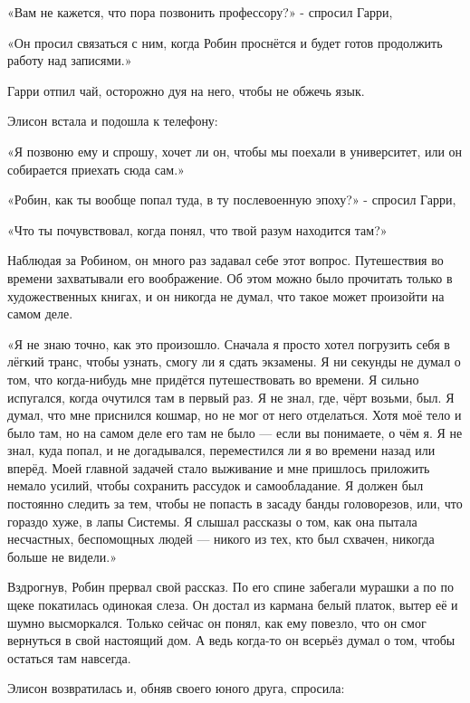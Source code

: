 \documentclass[a4paper,12pt]{book}
\begin{document}
\par
«Вам не кажется, что пора позвонить профессору?» - спросил Гарри,
\par
«Он просил связаться с ним, когда Робин проснётся и будет готов продолжить работу над записями.»
\par
Гарри отпил чай, осторожно дуя на него, чтобы не обжечь язык.
\par
Элисон встала и подошла к телефону:
\par
«Я позвоню ему и спрошу, хочет ли он, чтобы мы поехали в университет, или он собирается приехать сюда сам.»\\
\par
«Робин, как ты вообще попал туда, в ту послевоенную эпоху?» - спросил Гарри,
\par
«Что ты почувствовал, когда понял, что твой разум находится там?»
\par
Наблюдая за Робином, он много раз задавал себе этот вопрос. Путешествия во времени захватывали его воображение. Об этом можно было прочитать только в художественных книгах, и он никогда не думал, что такое может произойти на самом деле.
\par
«Я не знаю точно, как это произошло. Сначала я просто хотел погрузить себя в лёгкий транс, чтобы узнать, смогу ли я сдать экзамены. Я ни секунды не думал о том, что когда-нибудь мне придётся путешествовать во времени. Я сильно испугался, когда очутился там в первый раз. Я не знал, где, чёрт возьми, был. Я думал, что мне приснился кошмар, но не мог от него отделаться. Хотя моё тело и было там, но на самом деле его там не было — если вы понимаете, о чём я. Я не знал, куда попал, и не догадывался, переместился ли я во времени назад или вперёд. Моей главной задачей стало выживание и мне пришлось приложить немало усилий, чтобы сохранить рассудок и самообладание. Я должен был постоянно следить за тем, чтобы не попасть в засаду банды головорезов, или, что гораздо хуже, в лапы Системы. Я слышал рассказы о том, как она пытала несчастных, беспомощных людей — никого из тех, кто был схвачен, никогда больше не видели.»
\par
Вздрогнув, Робин прервал свой рассказ. По его спине забегали мурашки а по по щеке покатилась одинокая слеза. Он достал из кармана белый платок, вытер её и шумно высморкался. Только сейчас он понял, как ему повезло, что он смог вернуться в свой настоящий дом. А ведь когда-то он всерьёз думал о том, чтобы остаться там навсегда.\\
\par
Элисон возвратилась и, обняв своего юного друга, спросила:
\end{document}
